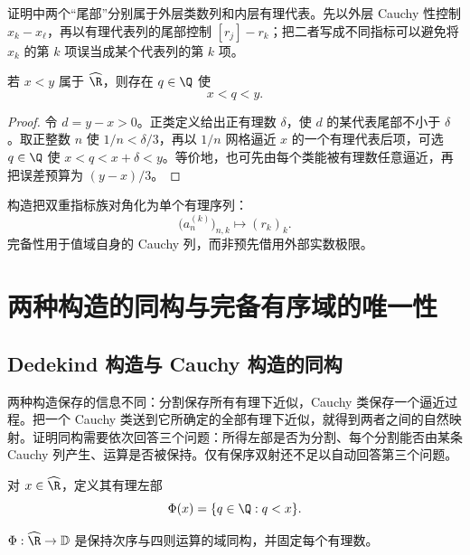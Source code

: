 证明中两个“尾部”分别属于外层类数列和内层有理代表。先以外层 Cauchy 性控制 \(x_k-x_\ell\)，再以有理代表列的尾部控制 \([r_j]-r_k\)；把二者写成不同指标可以避免将 \(x_k\) 的第 \(k\) 项误当成某个代表列的第 \(k\) 项。

\begin{proposition}[构造域中有理数的稠密性]
若 \(x<y\) 属于 \(\widehat{\R}\)，则存在 \(q\in\Q\) 使
\[
 x<q<y.
\]
\end{proposition}

\begin{proof}
令 \(d=y-x>0\)。正类定义给出正有理数 \(\delta\)，使 \(d\) 的某代表尾部不小于 \(\delta\)。取正整数 \(n\) 使 \(1/n<\delta/3\)，再以 \(1/n\) 网格逼近 \(x\) 的一个有理代表后项，可选 \(q\in\Q\) 使 \(x<q<x+\delta<y\)。等价地，也可先由每个类能被有理数任意逼近，再把误差预算为 \((y-x)/3\)。
\end{proof}

构造把双重指标族对角化为单个有理序列：
\[
 \bigl(a_n^{(k)}\bigr)_{n,k}\longmapsto(r_k)_k.
\]
完备性用于值域自身的 Cauchy 列，而非预先借用外部实数极限。

\section{两种构造的同构与完备有序域的唯一性}

\subsection{Dedekind 构造与 Cauchy 构造的同构}

两种构造保存的信息不同：分割保存所有有理下近似，Cauchy 类保存一个逼近过程。把一个 Cauchy 类送到它所确定的全部有理下近似，就得到两者之间的自然映射。证明同构需要依次回答三个问题：所得左部是否为分割、每个分割能否由某条 Cauchy 列产生、运算是否被保持。仅有保序双射还不足以自动回答第三个问题。


对 \(x\in\widehat{\R}\)，定义其有理左部
\[
 \Phi(x)=\{q\in\Q:q<x\}.
\]

\begin{theorem}
\(\Phi:\widehat{\R}\to\mathbb D\) 是保持次序与四则运算的域同构，并固定每个有理数。
\end{theorem}

